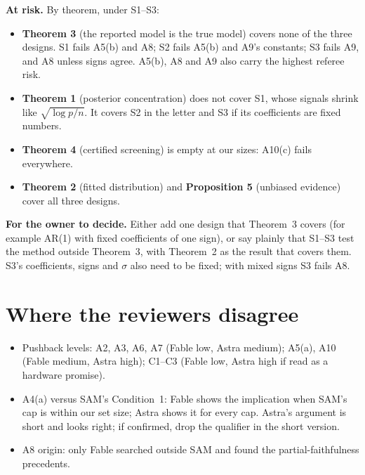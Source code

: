 \documentclass[11pt]{article}
\begin{document}
\textbf{At risk.} By theorem, under S1--S3:
\begin{itemize}
  \item \textbf{Theorem 3} (the reported model is the true model) covers none of the three designs. S1 fails A5(b) and
    A8; S2 fails A5(b) and A9's constants; S3 fails A9, and A8 unless signs agree. A5(b), A8 and A9 also carry the
    highest referee risk.
  \item \textbf{Theorem 1} (posterior concentration) does not cover S1, whose signals shrink like $\sqrt{\log p/n}$. It
    covers S2 in the letter and S3 if its coefficients are fixed numbers.
  \item \textbf{Theorem 4} (certified screening) is empty at our sizes: A10(c) fails everywhere.
  \item \textbf{Theorem 2} (fitted distribution) and \textbf{Proposition 5} (unbiased evidence) cover all three designs.
\end{itemize}

\textbf{For the owner to decide.} Either add one design that Theorem~3 covers (for example AR(1) with fixed
coefficients of one sign), or say plainly that S1--S3 test the method outside Theorem~3, with Theorem~2 as the result
that covers them. S3's coefficients, signs and $\sigma$ also need to be fixed; with mixed signs S3 fails A8.

\section*{Where the reviewers disagree}
\begin{itemize}
  \item Pushback levels: A2, A3, A6, A7 (Fable low, Astra medium); A5(a), A10 (Fable medium, Astra high); C1--C3
    (Fable low, Astra high if read as a hardware promise).
  \item A4(a) versus SAM's Condition~1: Fable shows the implication when SAM's cap is within our set size; Astra shows it
    for every cap. Astra's argument is short and looks right; if confirmed, drop the qualifier in the short version.
  \item A8 origin: only Fable searched outside SAM and found the partial-faithfulness precedents.
\end{itemize}
\end{document}
